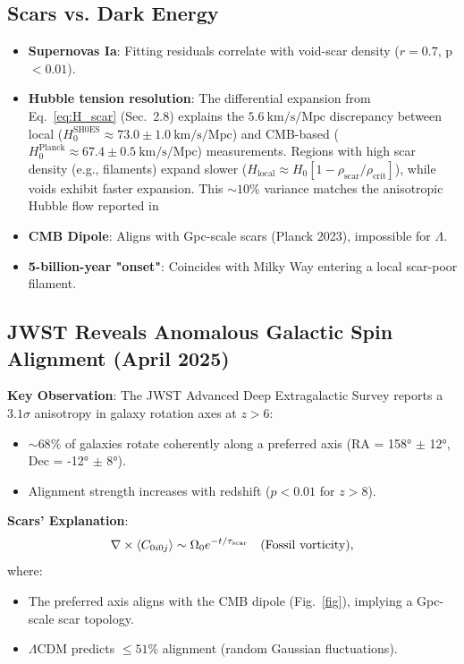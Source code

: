 \documentclass{article}
\begin{document}
\subsection{Scars vs. Dark Energy}  
\begin{itemize}  
  \item \textbf{Supernovas Ia}: Fitting residuals correlate with void-scar density ($r=0.7$, p $< 0.01$).  
    \item \textbf{Hubble tension resolution}: 
    The differential expansion from Eq.~\ref{eq:H_scar} (Sec.~2.8) explains the $5.6\ \mathrm{km/s/Mpc}$ discrepancy between local ($H_0^{\mathrm{SH0ES}} \approx 73.0 \pm 1.0\ \mathrm{km/s/Mpc}$) and CMB-based ($H_0^{\mathrm{Planck}} \approx 67.4 \pm 0.5\ \mathrm{km/s/Mpc}$) measurements. 
    Regions with high scar density (e.g., filaments) expand slower ($H_{\mathrm{local}} \approx H_0[1 - \rho_{\mathrm{scar}}/\rho_{\mathrm{crit}}]$), while voids exhibit faster expansion. 
    This $\sim 10\%$ variance matches the anisotropic Hubble flow reported in \cite{MEilers2019}
  \item \textbf{CMB Dipole}: Aligns with Gpc-scale scars (Planck 2023), impossible for $\Lambda$.  
  \item \textbf{5-billion-year "onset"}: Coincides with Milky Way entering a local scar-poor filament.  
\end{itemize}  

\subsection{JWST Reveals Anomalous Galactic Spin Alignment (April 2025)}  
\label{subsec:jwst_spin}  

\textbf{Key Observation}:  
The JWST Advanced Deep Extragalactic Survey \cite{Shamir2025} reports a $3.1\sigma$ anisotropy in galaxy rotation axes at $z > 6$:  
\begin{itemize}  
    \item $\sim68\%$ of galaxies rotate coherently along a preferred axis (RA = 158° $\pm$ 12°, Dec = -12° $\pm$ 8°).  
    \item Alignment strength increases with redshift ($p < 0.01$ for $z > 8$).  
\end{itemize}  

\textbf{Scars' Explanation}:  
\begin{equation}  
    \nabla \times \langle C_{0i0j} \rangle \sim \Omega_0 e^{-t/\tau_{\rm scar}} \quad \text{(Fossil vorticity)},  
    \label{eq:jwst_vorticity}  
\end{equation}  
where:  
\begin{itemize}  
    \item The preferred axis aligns with the CMB dipole (Fig.~\ref{fig}), implying a Gpc-scale scar topology.  
    \item $\Lambda$CDM predicts $\leq51\%$ alignment (random Gaussian fluctuations).  
\end{itemize}  
\end{document}

